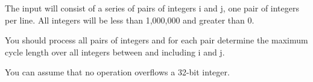 The input will consist of a series of pairs of integers i and j, one pair of integers per line. All integers will be less than 1,000,000 and greater than 0.

You should process all pairs of integers and for each pair determine the maximum cycle length over all integers between and including i and j.

You can assume that no operation overflows a 32-bit integer.